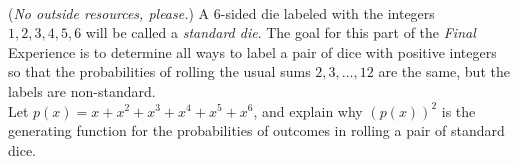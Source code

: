 \documentclass{article}
\begin{document}
\vspace{2em}
\noindent \underline{\hspace{5in}}
\vspace{2em}
\\
\noindent(\emph{No outside resources, please.}) A 6-sided die labeled with the integers $1, 2, 3, 4, 5, 6$ will be called a \emph{standard die}.  The goal for this part of the \emph{Final} Experience is to determine all ways to label a pair of dice with positive integers so that the probabilities of rolling the usual sums $2, 3, \dots ,12$ are the same, but the labels are non-standard.  \\
  Let $p(x) = x+x^2+x^3+x^4+x^5+x^6$, and explain why $(p(x))^2$ is the generating function for the probabilities of outcomes in rolling a pair of standard dice.
\end{document}
